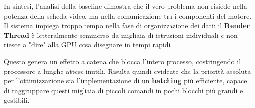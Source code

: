 In sintesi, l'analisi della baseline dimostra che il vero problema non risiede nella potenza della scheda video, ma nella comunicazione tra i componenti del motore. Il sistema impiega troppo tempo nella fase di organizzazione dei dati: il \textbf{Render Thread} è letteralmente sommerso da migliaia di istruzioni individuali e non riesce a "dire" alla GPU cosa disegnare in tempi rapidi. 

Questo genera un effetto a catena che blocca l'intero processo, costringendo il processore a lunghe attese inutili. Risulta quindi evidente che la priorità assoluta per l'ottimizzazione sia l'implementazione di un \textbf{batching} più efficiente, capace di raggruppare questi migliaia di piccoli comandi in pochi blocchi più grandi e gestibili.
